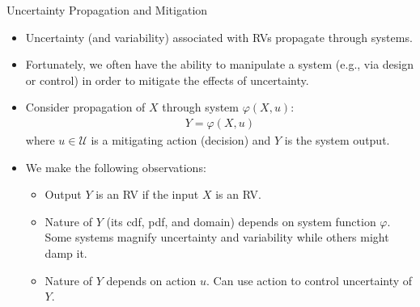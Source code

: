 \documentclass[9pt]{beamer}
\begin{document}
%
\begin{frame}{Uncertainty Propagation and Mitigation}
\begin{itemize}
 \setlength{\itemsep}{10pt}
\item Uncertainty (and variability) associated with RVs propagate through systems. 

\item Fortunately, we often have the ability to manipulate a system (e.g., via design or control) in order to mitigate the effects of uncertainty. 

\item Consider propagation of $X$ through system $\varphi(X,u)$:
\begin{align*}
Y=\varphi(X,u)
\end{align*}
where $u\in \mathcal{U}$ is a mitigating action (decision) and $Y$ is the system output. 
\item We make the following observations:
\begin{block}{}
\begin{itemize}
 \setlength{\itemsep}{5pt}
\item Output $Y$ is an RV if the input $X$ is an RV.
\item Nature of $Y$ (its cdf, pdf, and domain) depends on system function $\varphi$. Some systems magnify uncertainty and variability while others might damp it. 
\item Nature of $Y$ depends on action $u$.  Can use action to control uncertainty of $Y$.  
\end{itemize}
\end{block}
\end{itemize}

\end{frame}
\end{document}
